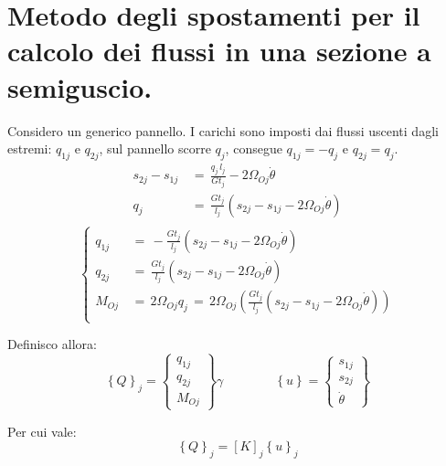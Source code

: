 \section{Metodo degli spostamenti per il calcolo dei flussi in una sezione a semiguscio.}

Considero un generico pannello. I carichi sono imposti dai flussi uscenti dagli estremi: $q_{1j}$ e $q_{2j}$, sul pannello scorre $q_j$, consegue $q_{1j} = -q_j$ e $q_{2j}=q_j$.
\begin{align*}
    s_{2j}-s_{1j} \,&=\,\frac{q_j\,l_j}{Gt_j}- 2\Omega_{Oj}\dot{\theta}\\
    q_j \,&=\,\frac{Gt_j}{l_j} (s_{2j}-s_{1j}- 2\Omega_{Oj}\dot{\theta})\\
\end{align*}
\begin{equation*}
    \begin{cases}
        q_{1j} \,&=\,-\frac{Gt_j}{l_j} (s_{2j}-s_{1j}- 2\Omega_{Oj}\dot{\theta})\\
        q_{2j} \,&=\,\frac{Gt_j}{l_j} (s_{2j}-s_{1j}- 2\Omega_{Oj}\dot{\theta})\\
        M_{Oj} \,&=\, 2\Omega_{Oj}q_j \,=\,   2\Omega_{Oj}\left(      \frac{Gt_j}{l_j} (s_{2j}-s_{1j}- 2\Omega_{Oj}\dot{\theta})\right)\\
    \end{cases}
\end{equation*}


Definisco allora:
 \begin{equation*}
     \left\{Q\right\}_j = \left\{
    \begin{array}{c}
    q_{1j} \\ q_{2j} \\ M_{Oj}
    \end{array}
    \right\} \gamma
   \quad\quad\quad\quad
    \left\{u\right\} = \left\{
    \begin{array}{c}
    s_{1j} \\ s_{2j} \\ \dot{\theta}
    \end{array}
    \right\} 
 \end{equation*}

Per cui vale: 
\begin{equation*}
    \left\{Q\right\}_j = [K]_j  \left\{ u\right\}_j
\end{equation*}



